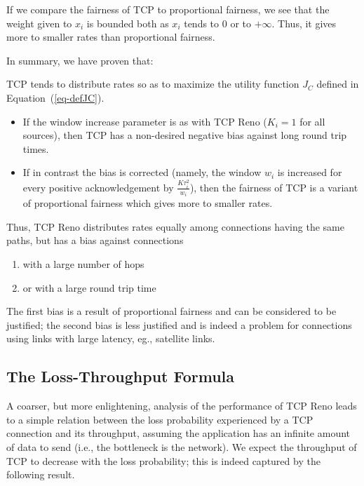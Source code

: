 If we compare the fairness of TCP to proportional fairness, we see
that the weight given to $x_{i}$ is bounded both as $x_i$ tends to
$0$ or to $+\infty$. Thus, it gives more to smaller rates than
proportional fairness.

 In summary, we have proven that:
\begin{proposition}
TCP tends to distribute rates so as to maximize the utility
function $J_C$ defined in Equation~(\ref{eq-defJC}).
\begin{itemize}
  \item If the window increase parameter is as with TCP Reno ($K_i=1$ for
all sources), then TCP has a non-desired negative bias against
long round trip times.
  \item If in contrast the bias is
corrected (namely, the window $w_i$ is increased for every
positive acknowledgement by $\frac{K \tau_i^2}{w_i}$), then the
fairness of TCP is a variant of proportional fairness which gives
more to smaller rates.
\end{itemize}
\end{proposition}






Thus, TCP Reno distributes rates equally among connections having
the same paths, but has a bias against connections
 \begin{enumerate}
        \item  with a large number of hops

        \item  or with a large round trip time
 \end{enumerate}

The first bias is a result of proportional fairness and can be
considered to be justified; the second bias is less justified and
is indeed a problem for connections using links with large latency, eg., satellite links.

\subsection{The Loss-Throughput Formula}
A coarser, but more enlightening, analysis of the performance of TCP Reno leads to a simple relation between the loss probability experienced by a TCP connection and its throughput, assuming the application has an infinite amount of data to send (i.e., the bottleneck is the network). We expect the throughput of TCP to decrease with the loss probability; this is indeed captured by the following result.

